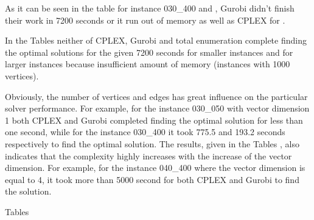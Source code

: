 \documentclass[10pt]{article}
\begin{document}
As it can be seen in the table  for instance 030\_400 and , Gurobi didn't finish their work in 7200 seconds or it run out of memory as well as CPLEX for . 

In the Tables  neither of CPLEX, Gurobi and total enumeration complete finding the optimal solutions for the given 7200 seconds for smaller instances and for larger instances because insufficient amount of memory (instances with 1000 vertices).

Obviously, the number of vertices and edges has great influence on the particular solver performance. For example, for the instance 030\_050 with vector dimension 1 both CPLEX and Gurobi completed finding the optimal solution for less than one second, while for the instance 030\_400 it took 775.5 and 193.2 seconds respectively to find the optimal solution. The results, given in the Tables , also indicates that the complexity highly increases with the increase of the vector dimension. For example, for the instance 040\_400 where the vector dimension  is equal to 4, it took more than 5000 second for both CPLEX and Gurobi to find the solution.  

Tables 
\end{document}
